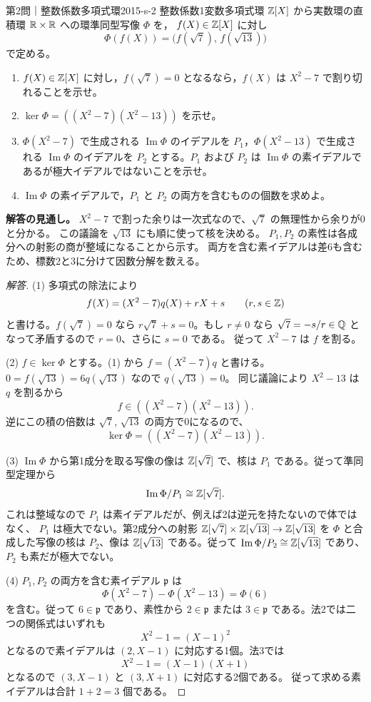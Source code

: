 \begin{problem}{第2問｜整数係数多項式環}{2015-s-2}
整数係数1変数多項式環 $\mathbb{Z}[X]$ から実数環の直積環 $\mathbb{R}\times\mathbb{R}$ への環準同型写像 $\Phi$ を，
$f(X)\in\mathbb{Z}[X]$ に対し
\[
\Phi(f(X))=\bigl(f(\sqrt7),\,f(\sqrt{13})\bigr)
\]
で定める。
\begin{enumerate}
  \item[(1)] $f(X)\in\mathbb{Z}[X]$ に対し，$f(\sqrt7)=0$ となるなら，$f(X)$ は $X^2-7$ で割り切れることを示せ。
  \item[(2)] $\ker\Phi=((X^2-7)(X^2-13))$ を示せ。
  \item[(3)] $\Phi(X^2-7)$ で生成される $\operatorname{Im}\Phi$ のイデアルを $P_1$，$\Phi(X^2-13)$ で生成される $\operatorname{Im}\Phi$ のイデアルを $P_2$ とする。$P_1$ および $P_2$ は $\operatorname{Im}\Phi$ の素イデアルであるが極大イデアルではないことを示せ。
  \item[(4)] $\operatorname{Im}\Phi$ の素イデアルで，$P_1$ と $P_2$ の両方を含むものの個数を求めよ。
\end{enumerate}
\end{problem}
\begin{memo*}
\textbf{解答の見通し。}
$X^2-7$ で割った余りは一次式なので、$\sqrt7$ の無理性から余りが0と分かる。
この議論を $\sqrt{13}$ にも順に使って核を決める。
$P_1,P_2$ の素性は各成分への射影の商が整域になることから示す。
両方を含む素イデアルは差6も含むため、標数2と3に分けて因数分解を数える。
\end{memo*}
\begin{proof}[解答]
(1) 多項式の除法により
\[
f(X)=(X^2-7)q(X)+rX+s\qquad(r,s\in\mathbb{Z})
\]
と書ける。$f(\sqrt7)=0$ なら $r\sqrt7+s=0$。もし $r\ne0$ なら
$\sqrt7=-s/r\in\mathbb{Q}$ となって矛盾するので $r=0$、さらに $s=0$ である。
従って $X^2-7$ は $f$ を割る。

(2) $f\in\ker\Phi$ とする。(1) から $f=(X^2-7)q$ と書ける。
$0=f(\sqrt{13})=6q(\sqrt{13})$ なので $q(\sqrt{13})=0$。
同じ議論により $X^2-13$ は $q$ を割るから
\[
f\in((X^2-7)(X^2-13)).
\]
逆にこの積の倍数は $\sqrt7$, $\sqrt{13}$ の両方で0になるので、
\[
\ker\Phi=((X^2-7)(X^2-13)).
\]

(3) $\operatorname{Im}\Phi$ から第1成分を取る写像の像は $\mathbb{Z}[\sqrt7]$ で、核は
$P_1$ である。従って準同型定理から
\[
\operatorname{Im}\Phi/P_1\cong\mathbb{Z}[\sqrt7].
\]
これは整域なので $P_1$ は素イデアルだが、例えば2は逆元を持たないので体ではなく、
$P_1$ は極大でない。第2成分への射影
$\mathbb{Z}[\sqrt7]\times\mathbb{Z}[\sqrt{13}]\to\mathbb{Z}[\sqrt{13}]$
を $\Phi$ と合成した写像の核は $P_2$、像は $\mathbb{Z}[\sqrt{13}]$ である。従って
$\operatorname{Im}\Phi/P_2\cong\mathbb{Z}[\sqrt{13}]$ であり、$P_2$ も素だが極大でない。

(4) $P_1,P_2$ の両方を含む素イデアル $\mathfrak p$ は
\[
\Phi(X^2-7)-\Phi(X^2-13)=\Phi(6)
\]
を含む。従って $6\in\mathfrak p$ であり、素性から $2\in\mathfrak p$ または
$3\in\mathfrak p$ である。法2では二つの関係式はいずれも
\[
X^2-1=(X-1)^2
\]
となるので素イデアルは $(2,X-1)$ に対応する1個。法3では
\[
X^2-1=(X-1)(X+1)
\]
となるので $(3,X-1)$ と $(3,X+1)$ に対応する2個である。
従って求める素イデアルは合計 $1+2=3$ 個である。
\end{proof}

